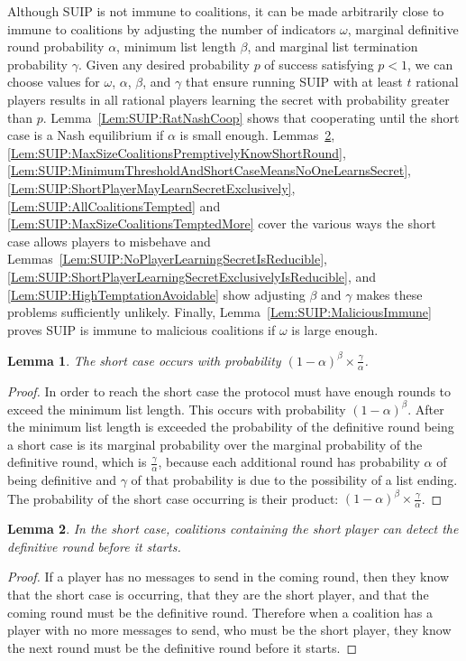 \documentclass[12pt]{dalcsthesis}
\newtheorem{lemma}{Lemma}
\begin{document}
Although SUIP is not immune to coalitions, it can be made arbitrarily close to immune to coalitions by adjusting the number of indicators $\omega$, marginal definitive round probability $\alpha$, minimum list length $\beta$, and marginal list termination probability $\gamma$. Given any desired probability $p$ of success satisfying $p < 1$, we can choose values for $\omega$, $\alpha$, $\beta$, and $\gamma$ that ensure running SUIP with at least $t$ rational players results in all rational players learning the secret with probability greater than $p$. Lemma~\ref{Lem:SUIP:RatNashCoop} shows that cooperating until the short case is a Nash equilibrium if $\alpha$ is small enough. Lemmas~\ref{Lem:SUIP:ShortPlayerCoalitionsPremptivelyKnowShortRound}, \ref{Lem:SUIP:MaxSizeCoalitionsPremptivelyKnowShortRound}, \ref{Lem:SUIP:MinimumThresholdAndShortCaseMeansNoOneLearnsSecret}, \ref{Lem:SUIP:ShortPlayerMayLearnSecretExclusively}, \ref{Lem:SUIP:AllCoalitionsTempted} and \ref{Lem:SUIP:MaxSizeCoalitionsTemptedMore} cover the various ways the short case allows players to misbehave and Lemmas~\ref{Lem:SUIP:NoPlayerLearningSecretIsReducible}, \ref{Lem:SUIP:ShortPlayerLearningSecretExclusivelyIsReducible}, and \ref{Lem:SUIP:HighTemptationAvoidable} show adjusting $\beta$ and $\gamma$ makes these problems sufficiently unlikely. Finally, Lemma~\ref{Lem:SUIP:MaliciousImmune} proves SUIP is immune to malicious coalitions if $\omega$ is large enough.

\begin{lemma}\label{Lem:SUIP:ChanceOfShortCase}The short case occurs with probability $(1-\alpha)^\beta \times \frac{\gamma}{\alpha}$.\end{lemma}
\begin{proof}
In order to reach the short case the protocol must have enough rounds to exceed the minimum list length. This occurs with probability $(1-\alpha)^\beta$. After the minimum list length is exceeded the probability of the definitive round being a short case is its marginal probability over the marginal probability of the definitive round, which is $\frac{\gamma}{\alpha}$, because each additional round has probability $\alpha$ of being definitive and $\gamma$ of that probability is due to the possibility of a list ending. The probability of the short case occurring is their product: $(1-\alpha)^\beta \times \frac{\gamma}{\alpha}$.
\end{proof}

\begin{lemma}\label{Lem:SUIP:ShortPlayerCoalitionsPremptivelyKnowShortRound}In the short case, coalitions containing the short player can detect the definitive round before it starts.\end{lemma}
\begin{proof}
If a player has no messages to send in the coming round, then they know that the short case is occurring, that they are the short player, and that the coming round must be the definitive round. Therefore when a coalition has a player with no more messages to send, who must be the short player, they know the next round must be the definitive round before it starts.
\end{proof}
\end{document}
